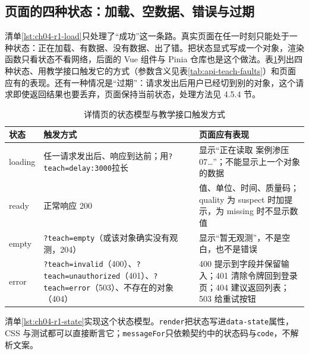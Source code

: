 \subsection{页面的四种状态：加载、空数据、错误与过期}

清单\ref{lst:ch04-r1-load}只处理了“成功”这一条路。真实页面在任一时刻只能处于一种状态：正在加载、有数据、没有数据、出了错。把状态显式写成一个对象，渲染函数只看状态不看网络，后面的 Vue 组件与 Pinia 仓库也是这个做法。表\ref{tab:ch04-r1-states}列出四种状态、用教学接口触发它的方式（参数含义见表\ref{tab:api-teach-faults}）和页面应有的表现。还有一种情况是“过期”：请求发出后用户已经切到别的对象，这个请求即使返回结果也要丢弃，页面保持当前状态，处理方法见 4.5.4 节。

\begin{table}[htbp]
\centering
\caption{详情页的状态模型与教学接口触发方式}
\label{tab:ch04-r1-states}
\begin{tabular}{p{}p{}p{}}
\toprule
状态 & 触发方式 & 页面应有表现 \\
\midrule
loading & 任一请求发出后、响应到达前；用\texttt{?teach=delay:3000}拉长 & 显示“正在读取 案例渗压07…”；不能显示上一个对象的数据 \\
ready & 正常响应 200 & 值、单位、时间、质量码；quality 为 suspect 时加提示，为 missing 时不显示数值 \\
empty & \texttt{?teach=empty}（或该对象确实没有观测，204） & 显示“暂无观测”，不是空白，也不是错误 \\
error & \texttt{?teach=invalid}（400）、\texttt{?teach=unauthorized}（401）、\texttt{?teach=error}（503）、不存在的对象（404） & 400 提示到字段并保留输入；401 清除令牌回到登录页；404 建议返回列表；503 给重试按钮 \\
\bottomrule
\end{tabular}
\end{table}

清单\ref{lst:ch04-r1-state}实现这个状态模型。\texttt{render}把状态写进\texttt{data-state}属性，CSS 与测试都可以直接断言它；\texttt{messageFor}只依赖契约中的状态码与\texttt{code}，不解析文案。

